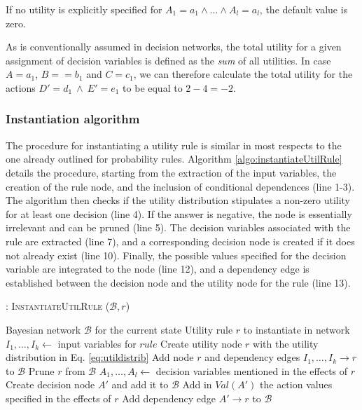 If no utility is explicitly specified for $A_1\!=\!a_1 \land \dots \land A_l\!=\!a_l$, the default value is zero. 

As is conventionally assumed in decision networks, the total utility for a given assignment of decision variables is defined as the \textit{sum} of all utilities.  In case $A\!=\!a_1$, $B=\!=\!b_1$ and $C\!=\!c_1$, we can therefore calculate the total utility for the actions $D'\!=\!d_1 \ \land \ E'\!=\!e_1$ to be equal to $2 - 4 = -2$. 


\subsubsection*{Instantiation algorithm} 

The procedure for instantiating a utility rule is similar in most respects to the one already outlined for probability rules. Algorithm \ref{algo:instantiateUtilRule} details the procedure, starting from the extraction of the input variables, the creation of the rule node, and the inclusion of conditional dependences (line 1-3). The algorithm then checks if the utility distribution stipulates a non-zero utility for at least one decision (line 4).  If the answer is negative, the node is essentially irrelevant and can be pruned (line 5).  The decision variables associated with the rule are extracted (line 7), and a corresponding decision node is created if it does not already exist (line 10). Finally, the possible values specified for the decision variable are integrated to the node (line 12), and a dependency edge is established between the decision node and the utility node for the rule (line 13). 

\begin{algorithm}[h!]
\caption{: \textsc{InstantiateUtilRule} ($\mathcal{B}, \mathit{r}$)}
\begin{algorithmic}[1] \vspace{1mm}
\REQUIRE Bayesian network $\mathcal{B}$ for the current state
\REQUIRE Utility rule $\mathit{r}$ to instantiate in network  \vspace{1mm}
\STATE $I_1, \dots, I_k \leftarrow $ input variables for $rule$
\STATE Create utility node $r$ with the utility distribution in Eq. \eqref{eq:utildistrib}
\STATE Add node $r$ and dependency edges $I_1, \dots, I_k \rightarrow r$ to $\mathcal{B}$ 
\STATE Prune $r$ from $\mathcal{B}$
\ELSE
\STATE $A_1, \dots, A_l \leftarrow$ decision variables mentioned in the effects of $r$
\STATE Create decision node $A'$ and add it to $\mathcal{B}$
\ENDIF
\STATE Add in $\textit{Val}(A')$ the action values specified in the effects of $r$
\STATE Add dependency edge $A' \rightarrow r$ to $\mathcal{B}$ 
\ENDFOR
\ENDIF
\end{algorithmic}
\label{algo:instantiateUtilRule}
\end{algorithm}

